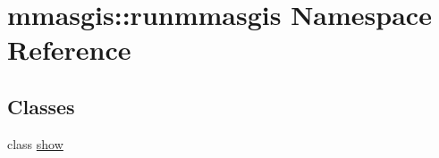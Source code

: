 \hypertarget{namespacemmasgis_1_1runmmasgis}{
\section{mmasgis::runmmasgis Namespace Reference}
\label{namespacemmasgis_1_1runmmasgis}
}
\subsection*{Classes}
\begin{DoxyCompactItemize}
\item 
class \hyperlink{classmmasgis_1_1runmmasgis_1_1show}{show}
\end{DoxyCompactItemize}
